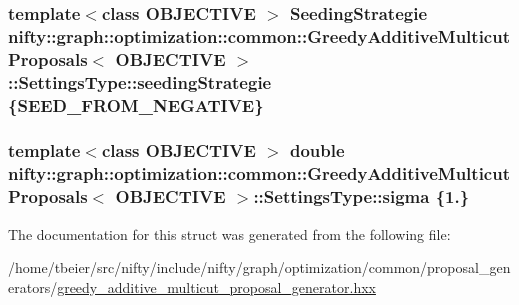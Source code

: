 \subsubsection[{seeding\+Strategie}]{\setlength{\rightskip}{0pt plus 5cm}template$<$class O\+B\+J\+E\+C\+T\+I\+V\+E $>$ {\bf Seeding\+Strategie} {\bf nifty\+::graph\+::optimization\+::common\+::\+Greedy\+Additive\+Multicut\+Proposals}$<$ O\+B\+J\+E\+C\+T\+I\+V\+E $>$\+::Settings\+Type\+::seeding\+Strategie \{{\bf S\+E\+E\+D\+\_\+\+F\+R\+O\+M\+\_\+\+N\+E\+G\+A\+T\+I\+V\+E}\}}\label{structnifty_1_1graph_1_1optimization_1_1common_1_1GreedyAdditiveMulticutProposals_1_1SettingsType_a5672f3adddbeb1bda8dc316ace61f346}
\hypertarget{structnifty_1_1graph_1_1optimization_1_1common_1_1GreedyAdditiveMulticutProposals_1_1SettingsType_a0a886927304d58dbebc4cafa5eeb5ff0}{}
\subsubsection[{sigma}]{\setlength{\rightskip}{0pt plus 5cm}template$<$class O\+B\+J\+E\+C\+T\+I\+V\+E $>$ double {\bf nifty\+::graph\+::optimization\+::common\+::\+Greedy\+Additive\+Multicut\+Proposals}$<$ O\+B\+J\+E\+C\+T\+I\+V\+E $>$\+::Settings\+Type\+::sigma \{1.\}}\label{structnifty_1_1graph_1_1optimization_1_1common_1_1GreedyAdditiveMulticutProposals_1_1SettingsType_a0a886927304d58dbebc4cafa5eeb5ff0}


The documentation for this struct was generated from the following file\+:\begin{DoxyCompactItemize}
\item 
/home/tbeier/src/nifty/include/nifty/graph/optimization/common/proposal\+\_\+generators/\hyperlink{greedy__additive__multicut__proposal__generator_8hxx}{greedy\+\_\+additive\+\_\+multicut\+\_\+proposal\+\_\+generator.\+hxx}\end{DoxyCompactItemize}
